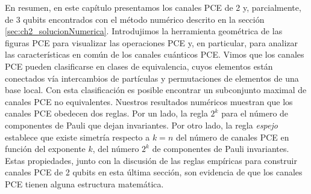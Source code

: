 En resumen, en este capítulo presentamos los canales PCE de 2 y, parcialmente, de 
3 qubits encontrados con el método numérico descrito en la sección 
\ref{sec:ch2_solucionNumerica}. Introdujimos la herramienta 
geométrica de las figuras PCE para visualizar las operaciones PCE y, en particular,
para analizar las características en común de los canales cuánticos PCE. 
Vimos que los canales PCE pueden clasificarse en clases de equivalencia,
cuyos elementos están conectados vía intercambios de partículas y permutaciones 
de elementos de una base local. 
Con esta clasificación es posible encontrar un subconjunto maximal de 
canales PCE no equivalentes.
Nuestros resultados numéricos
muestran que los canales PCE obedecen dos reglas. Por un lado, la regla $2^k$ para el número de 
componentes de Pauli que dejan invariantes. Por otro lado, la regla \textit{espejo} 
establece que existe simetría respecto a $k=n$ del número de canales PCE 
en función del exponente $k$, del número $2^k$ de 
componentes de Pauli invariantes. 
Estas propiedades, junto con la discusión de las reglas empíricas para 
construir canales PCE 
de 2 qubits en esta última sección, son evidencia de que los canales PCE 
tienen alguna estructura matemática.  


